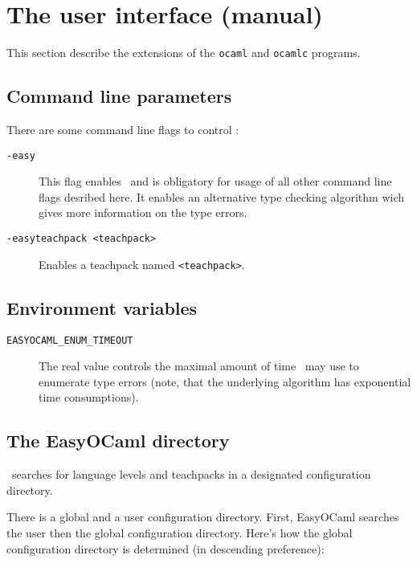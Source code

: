 
\section{The user interface (manual)}
\label{sec:manual}

This section describe the extensions of the \texttt{ocaml} and \texttt{ocamlc} programs.

\subsection{Command line parameters}
\label{sec:commandlineflags}

There are some command line flags to control \easyocaml:

\begin{description}
  \item[\texttt{-easy}] This flag enables \easyocaml\ and is obligatory for
    usage of all other command line flags desribed here.
    It enables an alternative type checking algorithm wich gives more
    information on the type errors.
  \item[\texttt{-easyteachpack <teachpack>}] Enables a teachpack named \texttt{<teachpack>}.
\end{description}

\subsection{Environment variables}

\begin{description}
  \item[\texttt{EASYOCAML\_ENUM\_TIMEOUT}] \label{man:timeout}
    The real value controls the maximal amount of
    time \easyocaml\ may use to enumerate type errors (note, that the underlying algorithm
    has exponential time consumptions).
\end{description}


\subsection{The EasyOCaml directory}

\easyocaml\ searches for language levels and teachpacks in a designated
configuration directory.

There is a global and a user configuration directory. First, EasyOCaml 
searches the user then the global configuration directory.  Here's how 
the global configuration directory is determined (in descending 
preference):

